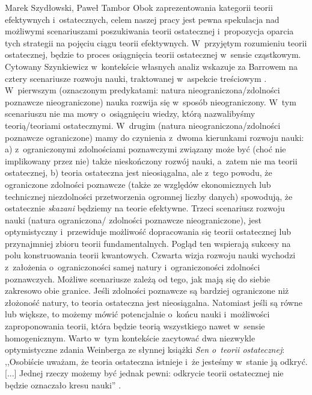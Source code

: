 \begin{artplenv2auth}{Marek Szydłowski, Paweł Tambor}
Obok zaprezentowania kategorii teorii efektywnych i~ostatecznych, celem naszej pracy jest pewna spekulacja nad możliwymi scenariuszami poszukiwania teorii ostatecznej i~propozycja oparcia tych strategii na pojęciu ciągu teorii efektywnych. W~przyjętym rozumieniu teorii ostatecznej, będzie to proces osiągnięcia teorii ostatecznej w~sensie cząstkowym. Cytowany Szynkiewicz w~kontekście własnych analiz wskazuje za Barrowem na cztery scenariusze rozwoju nauki, traktowanej w~aspekcie treściowym
\parencite[][s.~118]{szynkiewicz_teorie_2009}. %
 W~pierwszym (oznaczonym predykatami: natura nieograniczona/zdolności poznawcze nieograniczone) nauka rozwija się w~sposób nieograniczony. W~tym scenariuszu nie ma mowy o~osiągnięciu wiedzy, którą nazwalibyśmy teorią/teoriami ostatecznymi. W~drugim (natura nieograniczona/zdolności poznawcze ograniczone) mamy do czynienia z~dwoma kierunkami rozwoju nauki: a) z~ograniczonymi zdolnościami poznawczymi związany może być (choć nie implikowany przez nie) także nieskończony rozwój nauki, a~zatem nie ma teorii ostatecznej, b) teoria ostateczna jest nieosiągalna, ale z~tego powodu, że ograniczone zdolności poznawcze (także ze względów ekonomicznych lub technicznej niezdolności przetworzenia ogromnej liczby danych) spowodują, że ostatecznie \textit{skazani} będziemy na teorie efektywne. Trzeci scenariusz rozwoju nauki (natura ograniczona/ zdolności poznawcze nieograniczone), jest optymistyczny i~przewiduje możliwość dopracowania się teorii ostatecznej lub przynajmniej zbioru teorii fundamentalnych. Pogląd ten wspierają sukcesy na polu konstruowania teorii kwantowych. Czwarta wizja rozwoju nauki wychodzi z~założenia o~ograniczoności samej natury i~ograniczoności zdolności poznawczych. Możliwe scenariusze zależą od tego, jak mają się do siebie zakresowo obie granice. Jeśli zdolności poznawcze są bardziej ograniczone niż złożoność natury, to teoria ostateczna jest nieosiągalna. Natomiast jeśli są równe lub większe, to możemy mówić potencjalnie o~końcu nauki i~możliwości zaproponowania teorii, która będzie teorią wszystkiego nawet w~sensie homogenicznym. Warto w~tym kontekście zacytować dwa niezwykle optymistyczne zdania Weinberga ze słynnej książki \textit{Sen o~teorii ostatecznej}: ,,Osobiście uważam, że teoria ostateczna istnieje i~że jesteśmy w~stanie ją odkryć. [...] Jednej rzeczy możemy być jednak pewni: odkrycie teorii ostatecznej nie będzie oznaczało kresu nauki'' 
\parencite[][s.~186.190]{weinberg_sen_1992}.%



\end{artplenv2auth}

